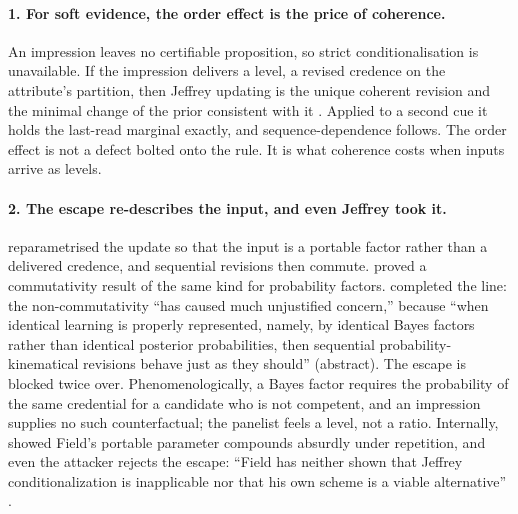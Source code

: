 \documentclass[11pt,a4paper]{article}
\begin{document}
\paragraph{1. For soft evidence, the order effect is the price of coherence.}
An impression leaves no certifiable proposition, so strict conditionalisation is
unavailable. If the impression delivers a level, a revised credence on the
attribute's partition, then Jeffrey updating is the unique coherent revision and
the minimal change of the prior consistent with it \citep{DiaconisZabell1982}.
Applied to a second cue it holds the last-read marginal exactly, and
sequence-dependence follows. The order effect is not a defect bolted onto the
rule. It is what coherence costs when inputs arrive as levels.

\paragraph{2. The escape re-describes the input, and even Jeffrey took it.}
\citet{Field1978} reparametrised the update so that the input is a portable
factor rather than a delivered credence, and sequential revisions then commute.
\citet{Jeffrey1988} proved a commutativity result of the same kind for
probability factors. \citet{Wagner2002} completed the line: the
non-commutativity ``has caused much unjustified concern,'' because ``when
identical learning is properly represented, namely, by identical Bayes factors
rather than identical posterior probabilities, then sequential
probability-kinematical revisions behave just as they should'' (abstract). The escape is
blocked twice over. Phenomenologically, a Bayes factor requires the probability
of the same credential for a candidate who is not competent, and an impression
supplies no such counterfactual; the panelist feels a level, not a ratio.
Internally, \citet{Garber1980} showed Field's portable parameter compounds
absurdly under repetition, and even the attacker rejects the escape:
``Field has neither shown that Jeffrey conditionalization is inapplicable nor
that his own scheme is a viable alternative'' \citep[S388]{Doring1999}.
\end{document}
